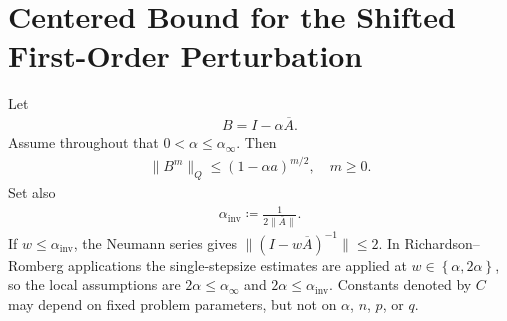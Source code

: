 
\section{Centered Bound for the Shifted First-Order Perturbation}


Let
\begin{equation}
\begin{aligned}
B = I - \alpha \overline{A}.
\end{aligned}
\end{equation}
Assume throughout that \(0 < \alpha \le \alpha_\infty\). Then
\begin{equation}
\begin{aligned}
\lVert B^m \rVert_Q \le (1 - \alpha a)^{m / 2},
\quad m \ge 0.
\end{aligned}
\end{equation}
Set also
\begin{equation}
\begin{aligned}
\alpha_{\text{inv}} \coloneqq \frac{1}{2 \lVert  \overline{A}  \rVert}.
\end{aligned}
\end{equation}
If \(w \le \alpha_{\text{inv}}\), the Neumann series gives
\(\lVert  (I - w \overline{A})^{-1}  \rVert \le 2\).
In Richardson--Romberg applications the single-stepsize estimates are applied
at \(w \in \left\{\alpha, 2 \alpha\right\}\), so the local assumptions are
\(2 \alpha \le \alpha_\infty\) and \(2 \alpha \le \alpha_{\text{inv}}\).
Constants denoted by \(C\) may depend on fixed problem parameters, but not on
\(\alpha\), \(n\), \(p\), or \(q\).

